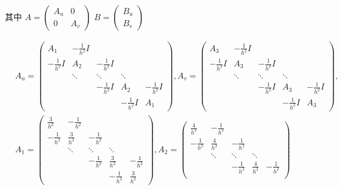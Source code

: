 \documentclass{article}
\begin{document}
其中 $A =
\begin{pmatrix}
    A_u & 0 \\
    0 & A_v
\end{pmatrix}$
$B =
\begin{pmatrix}
    B_u \\ B_v
\end{pmatrix}$

\begin{equation*}
    \begin{aligned}
        & A_u =
        \begin{pmatrix}
            A_1 & -\frac{1}{h^2} I & &\\
            -\frac{1}{h^2} I & A_2 & -\frac{1}{h^2} I\\
            & \ddots & \ddots & \ddots\\
            & & -\frac{1}{h^2} I & A_2 & -\frac{1}{h^2} I\\
            & & & -\frac{1}{h^2} I & A_1
        \end{pmatrix},
        A_v =
        \begin{pmatrix}
            A_3 & -\frac{1}{h^2} I & &\\
            -\frac{1}{h^2} I & A_3 & -\frac{1}{h^2} I\\
            & \ddots & \ddots & \ddots\\
            & & -\frac{1}{h^2} I & A_3 & -\frac{1}{h^2} I\\
            & & & -\frac{1}{h^2} I & A_3
        \end{pmatrix}, \\
        & A_1 =
        \begin{pmatrix}
            \frac{3}{h^2} & -\frac{1}{h^2} \\
            -\frac{1}{h^2} & \frac{3}{h^2} & -\frac{1}{h^2} \\
            & \ddots & \ddots &\ddots \\
            && -\frac{1}{h^2} & \frac{3}{h^2} & -\frac{1}{h^2} \\
            &&& -\frac{1}{h^2} & \frac{3}{h^2}
        \end{pmatrix}, A_2 =
        \begin{pmatrix}
            \frac{4}{h^2} & -\frac{1}{h^2} \\
            -\frac{1}{h^2} & \frac{4}{h^2} & -\frac{1}{h^2} \\
            & \ddots & \ddots &\ddots \\
            && -\frac{1}{h^2} & \frac{4}{h^2} & -\frac{1}{h^2} \\

\end{pmatrix}
\end{aligned}
\end{equation*}
\end{document}
